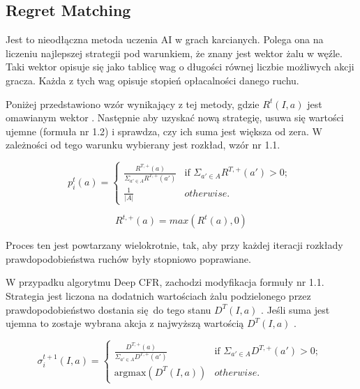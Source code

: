 \documentclass[12pt,oneside,a4paper]{report}
\begin{document}
\subsection{Regret Matching}

Jest to nieodłączna metoda uczenia AI w grach karcianych. Polega ona na liczeniu najlepszej 
strategii pod warunkiem, że znany jest wektor żalu w węźle.
Taki wektor opisuje się jako tablicę wag o długości równej liczbie możliwych akcji gracza. Każda z 
tych wag opisuje stopień opłacalności danego ruchu.


Poniżej przedstawiono wzór wynikający z tej metody, gdzie  
$R^{t}(I, a)$ jest omawianym wektor \cite{CFR}. 
Następnie aby uzyskać nową strategię, usuwa się wartości ujemne (formuła nr 1.2) 
i sprawdza, czy ich suma jest 
większa od zera. W zależności od tego warunku wybierany jest rozkład, wzór nr 1.1.


\begin{equation}
p^{t}_{i}\left( a \right) = \left\{ \begin{array}{ll}
      \frac{R^{T, \text{+}}\left(a\right)}{ \Sigma_{a' \in A} R^{T,\text{+}}\left(a'\right)} &
      \mbox{if $\Sigma_{a' \in A} R^{T,\text{+}}\left(a'\right) >
      0$};\\
      \frac{1}{|A|} & \mbox{$otherwise$}.\end{array} \right. \ 
\end{equation}

\vspace{1cm}
\begin{equation}
   R^{t,\text{+}}(a) = max(R^t(a),0)
\end{equation}


Proces ten jest powtarzany wielokrotnie, tak, aby przy każdej iteracji rozkłady prawdopodobieństwa
ruchów były stopniowo
poprawiane.

W przypadku algorytmu Deep CFR, zachodzi modyfikacja formuły nr 1.1. Strategia jest liczona na
dodatnich wartościach żalu podzielonego przez  prawdopodobieństwo dostania się do 
tego stanu $D^{T} (I, a)$ \cite{DCFR}.
Jeśli suma jest ujemna to zostaje wybrana akcja z najwyższą wartością $D^{T}(I, a)$ \cite{DCFR}.



\begin{equation}
\sigma^{t+1}_{i}\left(I, a \right) = \left\{ \begin{array}{ll}
      \frac{D^{T, \text{+}}\left(a\right)}{ \Sigma_{a' \in A} D^{T,\text{+}}\left(a'\right)} &
      \mbox{if $\Sigma_{a' \in A} D^{T,\text{+}}\left(a'\right) >
      0$};\\
      \text{argmax}(D^{T} (I, a)) & \mbox{$otherwise$}.\end{array} \right. \ 
\end{equation}
\end{document}
